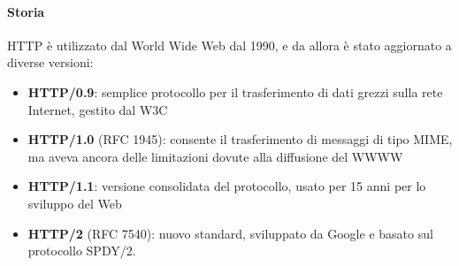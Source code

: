 \documentclass[a4paper,11pt]{article}
\begin{document}
\paragraph{Storia} HTTP è utilizzato dal World Wide Web dal 1990, e da allora è stato aggiornato a diverse versioni:
\begin{itemize}
\item \textbf{HTTP/0.9}: semplice protocollo per il trasferimento di dati grezzi sulla rete Internet, gestito dal W3C
\item \textbf{HTTP/1.0} (RFC 1945): consente il trasferimento di messaggi di tipo MIME, %
ma aveva ancora delle limitazioni dovute alla diffusione del WWWW 
\item \textbf{HTTP/1.1}: versione consolidata del protocollo, usato per 15 anni per lo sviluppo del Web
\item \textbf{HTTP/2} (RFC 7540): nuovo standard, sviluppato da Google e basato sul protocollo SPDY/2.
\end{itemize}
\end{document}
